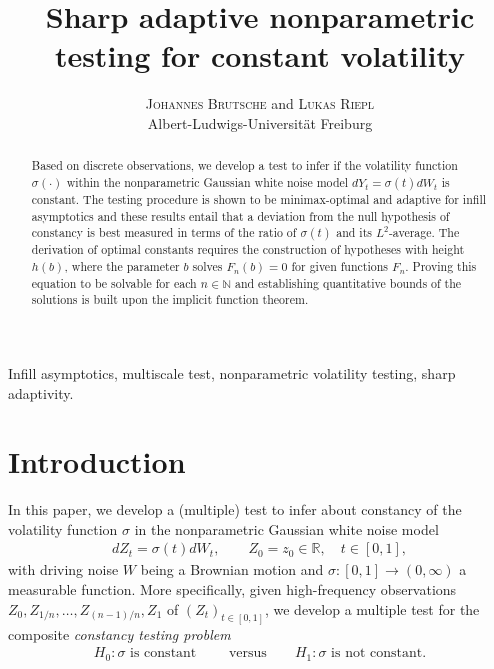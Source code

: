 \documentclass[10.5pt,letter]{article}
\title{Sharp adaptive nonparametric testing for constant volatility }
\author{\textsc{Johannes Brutsche} and \textsc{Lukas Riepl} \\ Albert-Ludwigs-Universität Freiburg}
\date{}
\numberwithin{equation}{section}
\theoremstyle{definition}
\newcommand{\R}{\mathbb{R}}
\newcommand{\N}{\mathbb{N}}
\newcommand{\1}{\mathbbm{1}}
\begin{document}
\maketitle



\vspace{-1cm}



\begin{abstract}
Based on discrete observations, we develop a test to infer if the volatility function $\sigma(\cdot)$ within the nonparametric Gaussian white noise model $dY_t = \sigma(t)dW_t$ is constant. The testing procedure is shown to be minimax-optimal and adaptive for infill asymptotics and these results entail that a deviation from the null hypothesis of constancy is best measured in terms of the ratio of $\sigma(t)$ and its $L^2$-average. The derivation of optimal constants requires the construction of hypotheses with height $h(b)$, where the parameter $b$ solves $F_n(b)=0$ for given functions $F_n$. Proving this equation to be solvable for each $n\in\N$ and establishing quantitative bounds of the solutions is built upon the implicit function theorem. 
\end{abstract} 


\vspace{0.5em}


\medskip 
{} 
Infill asymptotics, multiscale test, nonparametric volatility testing, sharp adaptivity.





\section{Introduction}

In this paper, we develop a (multiple) test to infer about constancy of the volatility function $\sigma$ in the nonparametric Gaussian white noise model 
\begin{align}\label{eq:Gaussian_white_noise}
    dZ_t = \sigma(t)dW_t, \qquad Z_0=z_0\in\R,\quad t\in [0,1],
\end{align}  
with driving noise $W$ being a Brownian motion and $\sigma:[0,1]\rightarrow (0,\infty)$ a measurable function. More specifically, given high-frequency observations $Z_0,Z_{1/n},\dots, Z_{(n-1)/n}, Z_1$ of $(Z_t)_{t\in [0,1]}$, we develop a multiple test for the composite \textit{constancy testing problem}
\begin{align}\label{eq:testing_problem}
    H_0: \sigma \textrm{ is constant } \qquad\textrm{versus}\qquad H_1: \sigma \textrm{ is not constant}.
\end{align}
\end{document}
